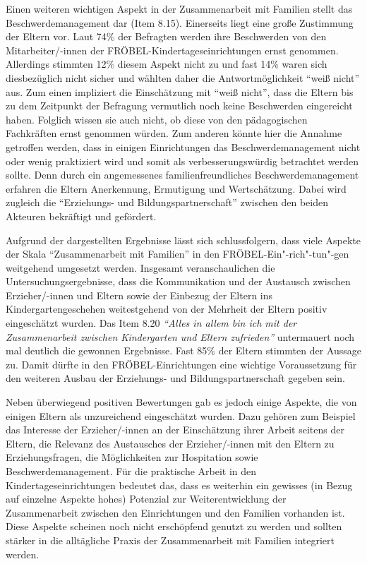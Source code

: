 \documentclass[12pt,a4paper]{article}
\begin{document}
	Einen weiteren wichtigen Aspekt in der Zusammenarbeit mit Familien stellt das Beschwerdemanagement dar (Item 8.15). Einerseits liegt eine große Zustimmung der Eltern vor. Laut 74\% der Befragten werden ihre Beschwerden von den Mitarbeiter/-innen der FRÖBEL-Kindertageseinrichtungen ernst genommen. Allerdings stimmten 12\% diesem Aspekt nicht zu und fast 14\% waren sich diesbezüglich nicht sicher und wählten daher die Antwortmöglichkeit "`weiß nicht"' aus. Zum einen impliziert die Einschätzung mit "`weiß nicht"', dass die Eltern bis zu dem Zeitpunkt der Befragung vermutlich noch keine Beschwerden eingereicht haben. Folglich wissen sie auch nicht, ob diese von den pädagogischen Fachkräften ernst genommen würden. Zum anderen könnte hier die Annahme getroffen werden, dass in einigen Einrichtungen das Beschwerdemanagement nicht oder wenig praktiziert wird und somit als verbesserungswürdig betrachtet werden sollte. Denn durch ein angemessenes familienfreundliches Beschwerdemanagement erfahren die Eltern Anerkennung, Ermutigung und Wertschätzung. Dabei wird zugleich die "`Erziehungs- und Bildungspartnerschaft"' zwischen den beiden Akteuren bekräftigt und gefördert.
	
	Aufgrund der dargestellten Ergebnisse lässt sich schlussfolgern, dass viele Aspekte der Skala "`Zusammenarbeit mit Familien"' in den FRÖBEL-Ein"-rich"-tun"-gen weitgehend umgesetzt werden. Insgesamt veranschaulichen die Untersuchungsergebnisse, dass die Kommunikation und der Austausch zwischen Erzieher/-innen und Eltern sowie der Einbezug der Eltern ins Kindergartengeschehen weitestgehend von der Mehrheit der Eltern positiv eingeschätzt wurden. Das Item 8.20 \textit{"`Alles in allem bin ich mit der Zusammenarbeit zwischen Kindergarten und Eltern zufrieden"'} untermauert noch mal deutlich die gewonnen Ergebnisse. Fast 85\% der Eltern stimmten der Aussage zu. Damit dürfte in den FRÖBEL-Einrichtungen eine wichtige Voraussetzung für den weiteren Ausbau der Erziehungs- und Bildungspartnerschaft gegeben sein.
	
	Neben überwiegend positiven Bewertungen gab es jedoch einige Aspekte, die von einigen Eltern als unzureichend eingeschätzt wurden. Dazu gehören zum Beispiel das Interesse der Erzieher/-innen an der Einschätzung ihrer Arbeit seitens der Eltern, die Relevanz des Austausches der Erzieher/-innen mit den Eltern zu Erziehungsfragen, die Möglichkeiten zur Hospitation sowie Beschwerdemanagement. Für die praktische Arbeit in den Kindertageseinrichtungen bedeutet das, dass es weiterhin ein gewisses (in Bezug auf einzelne Aspekte hohes) Potenzial zur Weiterentwicklung der Zusammenarbeit zwischen den Einrichtungen und den Familien vorhanden ist. Diese Aspekte scheinen noch nicht erschöpfend genutzt zu werden und sollten stärker in die alltägliche Praxis der Zusammenarbeit mit Familien integriert werden.
	
\end{document}
